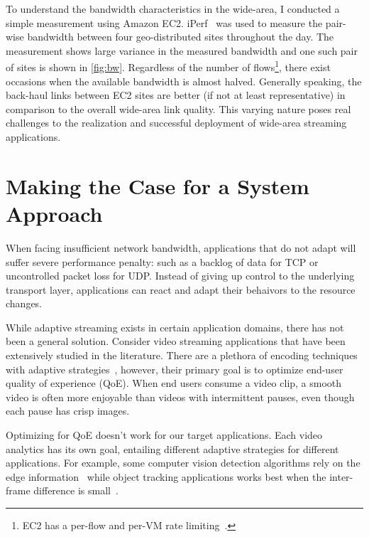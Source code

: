 To understand the bandwidth characteristics in the wide-area, I conducted a
simple measurement using Amazon EC2. iPerf~\cite{iperf} was used to measure the
pair-wise bandwidth between four geo-distributed sites throughout the day. The
measurement shows large variance in the measured bandwidth and one such pair of
sites is shown in \autoref{fig:bw}. Regardless of the number of
flows\footnote{EC2 has a per-flow and per-VM rate
  limiting~\cite{zhang2016guaranteeing}.}, there exist occasions when the
available bandwidth is almost halved. Generally speaking, the back-haul links
between EC2 sites are better (if not at least representative) in comparison to
the overall wide-area link quality. This varying nature poses real challenges to
the realization and successful deployment of wide-area streaming applications.

\section{Making the Case for a System Approach}
\label{sec:bat}

When facing insufficient network bandwidth, applications that do not adapt will
suffer severe performance penalty: such as a backlog of data for TCP or
uncontrolled packet loss for UDP. Instead of giving up control to the underlying
transport layer, applications can react and adapt their behaivors to the
resource changes.

While adaptive streaming exists in certain application domains, there has not
been a general solution. Consider video streaming applications that have been
extensively studied in the literature. There are a plethora of encoding
techniques~\cite{richardson2011h, grange2016vp9} with adaptive
strategies~\cite{yin2015control, michalos2012dynamic, pantos2016http}, however,
their primary goal is to optimize end-user quality of experience (QoE).  When
end users consume a video clip, a smooth video is often more enjoyable than
videos with intermittent pauses, even though each pause has crisp images.

Optimizing for QoE doesn't work for our target applications. Each video
analytics has its own goal, entailing different adaptive strategies for
different applications. For example, some computer vision detection algorithms
rely on the edge information~\cite{canny1986computational, lowe2004distinctive,
  viola2001rapid} while object tracking applications works best when the
inter-frame difference is small~\cite{allen2004object}.

